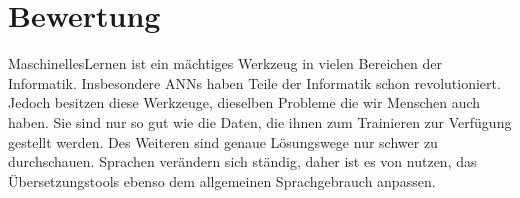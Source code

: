 \documentclass{thesisclass}
\begin{document}
\chapter{Bewertung} 
\gls{MaschinellesLernen} ist ein mächtiges Werkzeug in vielen Bereichen der Informatik. Insbesondere \gls{ANN}s haben Teile der Informatik schon revolutioniert.
Jedoch besitzen diese Werkzeuge, dieselben Probleme die wir Menschen auch haben. Sie sind nur so gut wie die Daten, die ihnen zum Trainieren zur Verfügung gestellt werden. Des Weiteren sind genaue Lösungswege nur schwer zu durchschauen. Sprachen verändern sich ständig, daher ist es von nutzen, das Übersetzungstools ebenso dem allgemeinen Sprachgebrauch anpassen.

\cleardoublepage
{}
{}

{}	%
{}	%




%


\cleardoublepage
\printglossary
\end{document}
